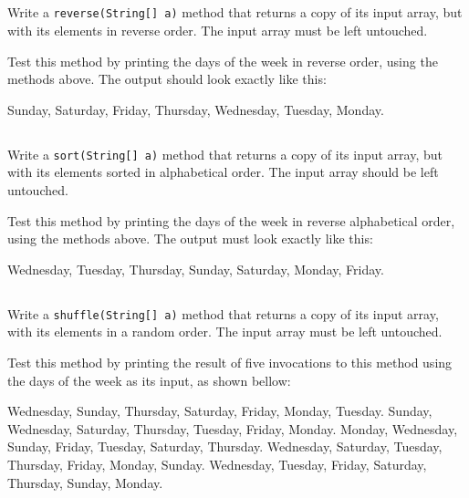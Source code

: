 \documentclass[a4paper, 11pt]{article}
\begin{document}
\subsection{}

Write a \texttt{reverse(String[] a)} method that returns a copy of its input
array, but with its elements in reverse order. The input array must be left
untouched.

Test this method by printing the days of the week in reverse order, using the
methods above. The output should look exactly like this:

\begin{blackboard}
Sunday, Saturday, Friday, Thursday, Wednesday, Tuesday, Monday.
\end{blackboard}

\subsection{}

Write a \texttt{sort(String[] a)} method that returns a copy of its input
array, but with its elements sorted in alphabetical order. The input array
should be left untouched.

Test this method by printing the days of the week in reverse alphabetical
order, using the methods above. The output must look exactly like this:

\begin{blackboard}
Wednesday, Tuesday, Thursday, Sunday, Saturday, Monday, Friday.
\end{blackboard}

\subsection{}

Write a \texttt{shuffle(String[] a)} method that returns a copy of its input
array, with its elements in a random order. The input array must be left
untouched.

Test this method by printing the result of five invocations to this method
using the days of the week as its input, as shown bellow:

\begin{blackboard}
Wednesday, Sunday, Thursday, Saturday, Friday, Monday, Tuesday.
Sunday, Wednesday, Saturday, Thursday, Tuesday, Friday, Monday.
Monday, Wednesday, Sunday, Friday, Tuesday, Saturday, Thursday.
Wednesday, Saturday, Tuesday, Thursday, Friday, Monday, Sunday.
Wednesday, Tuesday, Friday, Saturday, Thursday, Sunday, Monday.
\end{blackboard}
\end{document}
